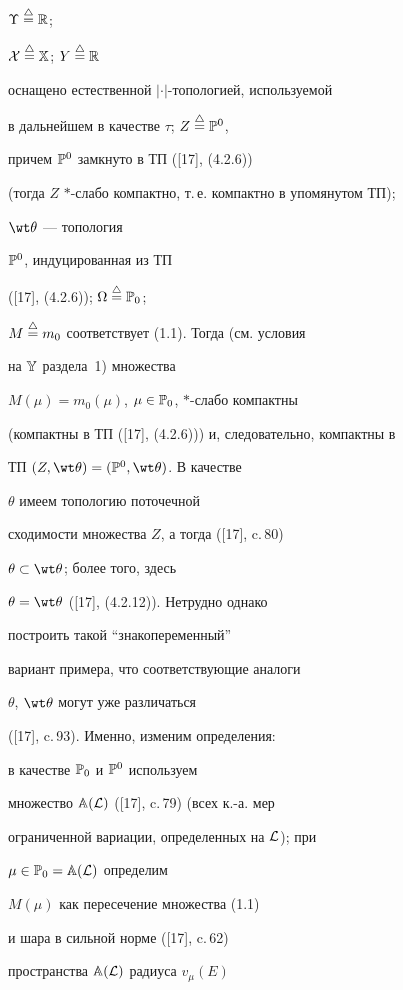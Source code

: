 ${\Upsilon}\overset{\triangle}{=}{}{\Bbb R}$;


${\cal X}\overset{\triangle}{=}{}{\Bbb X}$; $Y\overset{\triangle}{=}{}{\Bbb R}$


оснащено естественной $|\cdot|$-топологией, используемой


в дальнейшем в качестве $\tau$; $Z\overset{\triangle}{=}{}{{\Bbb P}^0}$,


причем ${\Bbb P}^0$ замкнуто в ТП ([17], (4.2.6))


(тогда $Z$ $*$-слабо компактно, т.\,е. компактно в упомянутом ТП);


$\wt \theta$ --- топология


${\Bbb P}^0$, индуцированная из ТП


([17], (4.2.6)); $\Omega\overset{\triangle}{=}{}{{\Bbb P}_0}$;


$M\overset{\triangle}{=}{} {m_0}$ соответствует (1.1). Тогда (см. условия


на ${\Bbb Y}$ раздела~1) множества


${M(\mu)} = {{m_0}(\mu)}$, $\mu \in {{\Bbb P}_0}$, $*$-слабо компактны


(компактны в ТП ([17], (4.2.6))) и, следовательно, компактны в


ТП $(Z,{\wt \theta}) = ({{\Bbb P}^0},{\wt \theta})$. В качестве


$\theta$ имеем топологию поточечной


сходимости множества $Z$, а тогда ([17], c.\,80)


${\theta} \subset {\wt \theta}$; более того, здесь


${\theta} = {\wt \theta}$ ([17], (4.2.12)). Нетрудно однако


построить такой ``знакопеременный''


вариант примера, что соответствующие аналоги


$\theta$, ${\wt \theta}$ могут уже различаться


([17], c.\,93). Именно, изменим определения:


в качестве ${\Bbb P}_0$ и ${\Bbb P}^0$ используем


множество ${{\Bbb A}({\cal L})}$ ([17], c.\,79) (всех к.-а. мер


ограниченной вариации, определенных на ${\cal L}$); при


$\mu \in {{\Bbb P}_0} = {{\Bbb A}({\cal L})}$ определим


${M(\mu)}$ как пересечение множества (1.1)


и шара в сильной норме ([17], c.\,62)


пространства ${{\Bbb A}({\cal L})}$ радиуса ${v_\mu}(E)$



